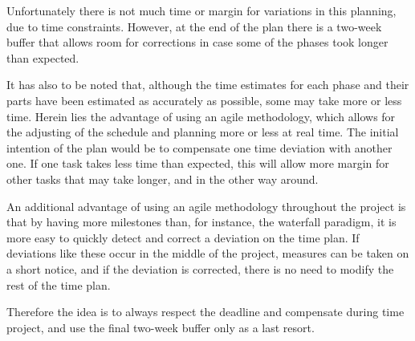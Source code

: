 Unfortunately there is not much time or margin for variations in this planning, due to time constraints. However, at the end of the plan there is a two-week buffer that allows room for corrections in case some of the phases took longer than expected.

It has also to be noted that, although the time estimates for each phase and their parts have been estimated as accurately as possible, some may take more or less time. Herein lies the advantage of using an agile methodology, which allows for the adjusting of the schedule and planning more or less at real time. The initial intention of the plan would be to compensate one time deviation with another one. If one task takes less time than expected, this will allow more margin for other tasks that may take longer, and in the other way around.

An additional advantage of using an agile methodology throughout the project is that by having more milestones than, for instance, the waterfall paradigm, it is more easy to quickly detect and correct a deviation on the time plan. If deviations like these occur in the middle of the project, measures can be taken on a short notice, and if the deviation is corrected, there is no need to modify the rest of the time plan.

Therefore the idea is to always respect the deadline and compensate during time project, and use the final two-week buffer only as a last resort.